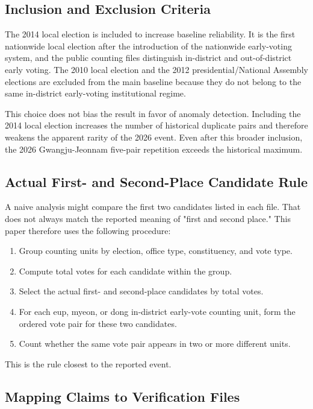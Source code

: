 \documentclass[preprint]{../ieie/IEIE}
\begin{document}
\subsection{Inclusion and Exclusion Criteria}

The 2014 local election is included to increase baseline reliability. It is the first nationwide local election after the introduction of the nationwide early-voting system, and the public counting files distinguish in-district and out-of-district early voting. The 2010 local election and the 2012 presidential/National Assembly elections are excluded from the main baseline because they do not belong to the same in-district early-voting institutional regime.

This choice does not bias the result in favor of anomaly detection. Including the 2014 local election increases the number of historical duplicate pairs and therefore weakens the apparent rarity of the 2026 event. Even after this broader inclusion, the 2026 Gwangju-Jeonnam five-pair repetition exceeds the historical maximum.

\subsection{Actual First- and Second-Place Candidate Rule}

A naive analysis might compare the first two candidates listed in each file. That does not always match the reported meaning of "first and second place." This paper therefore uses the following procedure:

\begin{enumerate}
\item Group counting units by election, office type, constituency, and vote type.
\item Compute total votes for each candidate within the group.
\item Select the actual first- and second-place candidates by total votes.
\item For each eup, myeon, or dong in-district early-vote counting unit, form the ordered vote pair for these two candidates.
\item Count whether the same vote pair appears in two or more different units.
\end{enumerate}

This is the rule closest to the reported event.

\subsection{Mapping Claims to Verification Files}
\end{document}
